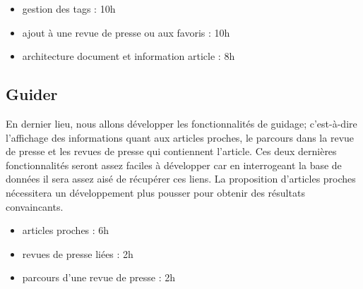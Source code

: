 		\begin{itemize}
			\item gestion des tags : 10h
			\item ajout à une revue de presse ou aux favoris : 10h
			\item architecture document et information article : 8h
		\end{itemize}

	\subsection{Guider}
	\label{subsec:guider}
		En dernier lieu, nous allons développer les fonctionnalités de guidage; c'est-à-dire l'affichage des informations quant aux articles proches, le parcours dans la revue de presse et les revues de presse qui contiennent l'article. Ces deux dernières fonctionnalités seront assez faciles à développer car en interrogeant la base de données il sera assez aisé de récupérer ces liens. La proposition d'articles proches nécessitera un développement plus pousser pour obtenir des résultats convaincants.

		\begin{itemize}
			\item articles proches : 6h
			\item revues de presse liées : 2h
			\item parcours d'une revue de presse : 2h
		\end{itemize}
